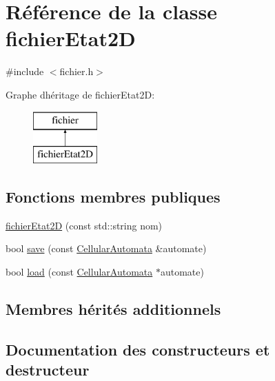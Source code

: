 \hypertarget{classfichier_etat2_d}{}\section{Référence de la classe fichier\+Etat2D}
\label{classfichier_etat2_d}


{\ttfamily \#include $<$fichier.\+h$>$}

Graphe d\textquotesingle{}héritage de fichier\+Etat2D\+:\begin{figure}[H]
\begin{center}
\leavevmode
\includegraphics[height=2.000000cm]{classfichier_etat2_d}
\end{center}
\end{figure}
\subsection*{Fonctions membres publiques}
\begin{DoxyCompactItemize}
\item 
\mbox{\hyperlink{classfichier_etat2_d_a0d47202c1e69bcf5a5380037b3688b2c}{fichier\+Etat2D}} (const std\+::string nom)
\item 
bool \mbox{\hyperlink{classfichier_etat2_d_a0acba6c601772898383006d2c705a177}{save}} (const \mbox{\hyperlink{class_cellular_automata}{Cellular\+Automata}} \&automate)
\item 
bool \mbox{\hyperlink{classfichier_etat2_d_a1509a84b133ea169370a46301f74739e}{load}} (const \mbox{\hyperlink{class_cellular_automata}{Cellular\+Automata}} $\ast$automate)
\end{DoxyCompactItemize}
\subsection*{Membres hérités additionnels}


\subsection{Documentation des constructeurs et destructeur}
\mbox{\label{classfichier_etat2_d_a0d47202c1e69bcf5a5380037b3688b2c}} 
